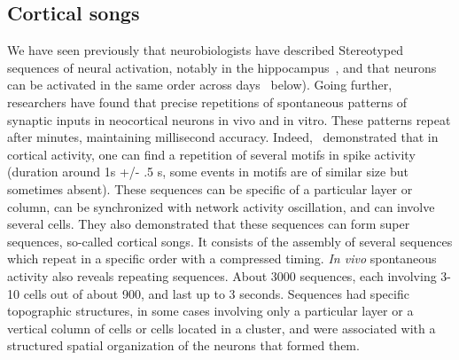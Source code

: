 \documentclass[brainsci, %
               review,submit,pdftex,moreauthors%
               ]{Definitions/mdpi}
\begin{document}
\subsection{Cortical songs}
We have seen previously that neurobiologists have described Stereotyped sequences of neural activation, notably in the hippocampus~\citep{pastalkova_internally_2008,villette_internally_2015,malvache_awake_2016}, and that neurons can be activated in the same order across days~\citep{haimerl_internal_2019} below). 
Going further, researchers have found that  precise repetitions of spontaneous patterns of synaptic inputs in neocortical neurons in vivo and in vitro. These patterns repeat after minutes, maintaining millisecond accuracy. Indeed,~\citet{ikegaya_synfire_2004} demonstrated that in cortical activity, one can find a repetition of several motifs in spike activity (duration around 1s +/- .5 s, some events in motifs are of similar size but sometimes absent). These sequences can be specific of a particular layer or column, can be synchronized with network activity oscillation, and can involve several cells. They also demonstrated that these sequences can form super sequences, so-called cortical songs. It consists of the assembly of several sequences which repeat in a specific order with a compressed timing. \emph{In vivo} spontaneous activity also reveals repeating sequences. About 3000 sequences, each involving 3-10 cells out of about 900, and last up to 3 seconds. Sequences had specific topographic structures, in some cases involving only a particular layer or a vertical column of cells or cells located in a cluster, and were associated with a structured spatial organization of the neurons that formed them. %
\end{document}
